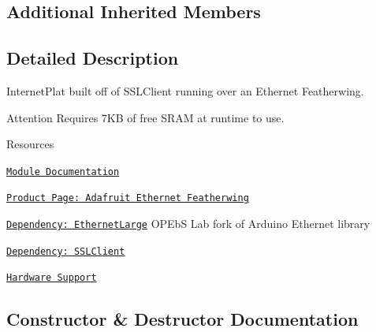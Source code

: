 \subsection*{Additional Inherited Members}


\subsection{Detailed Description}
Internet\+Plat built off of S\+S\+L\+Client running over an Ethernet Featherwing. 

\begin{DoxyAttention}{Attention}
Requires 7\+KB of free S\+R\+AM at runtime to use.
\end{DoxyAttention}
\begin{DoxyParagraph}{Resources}

\begin{DoxyItemize}
\item \href{https://openslab-osu.github.io/Loom/html/class_loom___ethernet.html}{\tt Module Documentation}
\item \href{https://www.adafruit.com/product/3201}{\tt Product Page\+: Adafruit Ethernet Featherwing}
\item \href{https://github.com/OPEnSLab-OSU/EthernetLarge}{\tt Dependency\+: Ethernet\+Large} O\+P\+EbS Lab fork of Arduino Ethernet library
\item \href{https://github.com/OPEnSLab-OSU/SSLClient}{\tt Dependency\+: S\+S\+L\+Client}
\item \href{https://github.com/OPEnSLab-OSU/Loom/wiki/Hardware-Support#ethernet}{\tt Hardware Support} 
\end{DoxyItemize}
\end{DoxyParagraph}


\subsection{Constructor \& Destructor Documentation}
